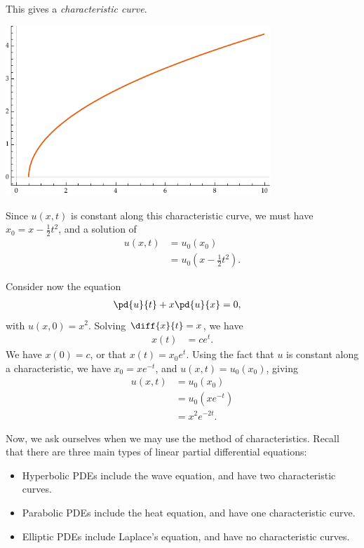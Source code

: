 \documentclass[10pt]{mypackage}
\begin{document}
\begin{example}
  This gives a \textit{characteristic curve}.
  \begin{center}
    \includegraphics[width=10cm]{images/characteristic_curve.pdf}
  \end{center}
  Since $u\left( x,t \right)$ is constant along this characteristic curve, we must have $x_0 = x - \frac{1}{2}t^2$, and a solution of
  \begin{align*}
    u\left( x,t \right) &= u_0\left( x_0 \right)\\
                        &= u_0\left( x-\frac{1}{2}t^2 \right).
  \end{align*}
\end{example}
\begin{example}
  Consider now the equation
  \begin{align*}
    \pd{u}{t} + x\pd{u}{x} &= 0,
  \end{align*}
  with $u\left( x,0 \right) = x^2$. Solving $\diff{x}{t} = x$, we have
  \begin{align*}
    x(t) &= ce^{t}.
  \end{align*}
  We have $x(0) = c$, or that $x(t) = x_0e^{t}$. Using the fact that $u$ is constant along a characteristic, we have $x_0 = xe^{-t}$, and $u\left( x,t \right) = u_0\left( x_0 \right)$, giving
  \begin{align*}
    u\left( x,t \right) &= u_0\left( x_0 \right)\\
                        &= u_0\left( xe^{-t} \right)\\
                        &= x^2e^{-2t}.
  \end{align*}
\end{example}
Now, we ask ourselves when we may use the method of characteristics. Recall that there are three main types of linear partial differential equations:
\begin{itemize}
  \item Hyperbolic PDEs include the wave equation, and have two characteristic curves.
  \item Parabolic PDEs include the heat equation, and have one characteristic curve.
  \item Elliptic PDEs include Laplace's equation, and have no characteristic curves.
\end{itemize}
\end{document}
